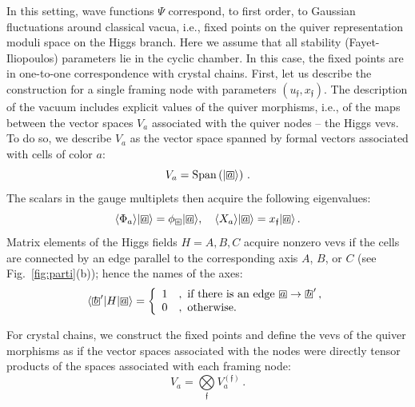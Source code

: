 \documentclass[10pt]{article}
\theoremstyle{definition}
\def\ff{\mathfrak{f}}
\def\lm{\limits}
\numberwithin{equation}{section}
\newcommand\sqbox[1]{{
		\setbox0=\hbox{\mbox{$\Box$}}
		\setbox1=\hbox{\mbox{\raisebox{0.35ex}{\small #1}}}
		\mbox{\raisebox{-0.2ex}{\rlap{\hbox to \wd0{\hss{\box1}\hss}}\box0}}
}}
\newcommand\ssqbox[1]{{
		\setbox0=\hbox{\mbox{$\scriptstyle\Box$}}
		\setbox1=\hbox{\mbox{\raisebox{0.35ex}{\tiny #1}}}
		\mbox{\raisebox{-0.2ex}{\rlap{\hbox to \wd0{\hss{\box1}\hss}}\box0}}
}}
\begin{document}
In this setting, wave functions $\Psi$ correspond, to first order, to Gaussian fluctuations around classical vacua, i.e., fixed points on the quiver representation moduli space on the Higgs branch.
Here we assume that all stability (Fayet-Iliopoulos) parameters lie in the cyclic chamber.
In this case, the fixed points are in one-to-one correspondence with crystal chains.
First, let us describe the construction for a single framing node with parameters $(u_{\ff},x_{\ff})$.
The description of the vacuum includes explicit values of the quiver morphisms, i.e., of the maps between the vector spaces $V_a$ associated with the quiver nodes -- the Higgs vevs.
To do so, we describe $V_a$ as the vector space spanned by formal vectors associated with cells of color $a$:
\begin{equation}
	V_a={\rm Span}\left(|\sqbox{$a$}\rangle\right)\,.
\end{equation}
The scalars in the gauge multiplets then acquire the following eigenvalues:
\begin{equation}
	\langle\Phi_a\rangle|\sqbox{$a$}\rangle=\phi_{\ssqbox{$a$}}|\sqbox{$a$}\rangle,\quad \langle X_a\rangle|\sqbox{$a$}\rangle=x_{\ff}|\sqbox{$a$}\rangle\,.
\end{equation}
Matrix elements of the Higgs fields $H=A,B,C$ acquire nonzero vevs if the cells are connected by an edge parallel to the corresponding axis $A$, $B$, or $C$ (see Fig.~\ref{fig:parti}(b)); hence the names of the axes:
\begin{equation}
	\langle \sqbox{$b$}'|H|\sqbox{$a$}\rangle= \left\{\begin{array}{ll}
		1 &,\mbox{ if there is an edge }\sqbox{$a$}\to\sqbox{$b$}'\,,\\
		0 &,\mbox{ otherwise.}
	\end{array}\right.
\end{equation}

For crystal chains, we construct the fixed points and define the vevs of the quiver morphisms as if the vector spaces associated with the nodes were directly tensor products of the spaces associated with each framing node:
\begin{equation}
	V_a=\bigotimes\lm_{\ff}V_a^{(\ff)}\,.
\end{equation}


\end{document}
